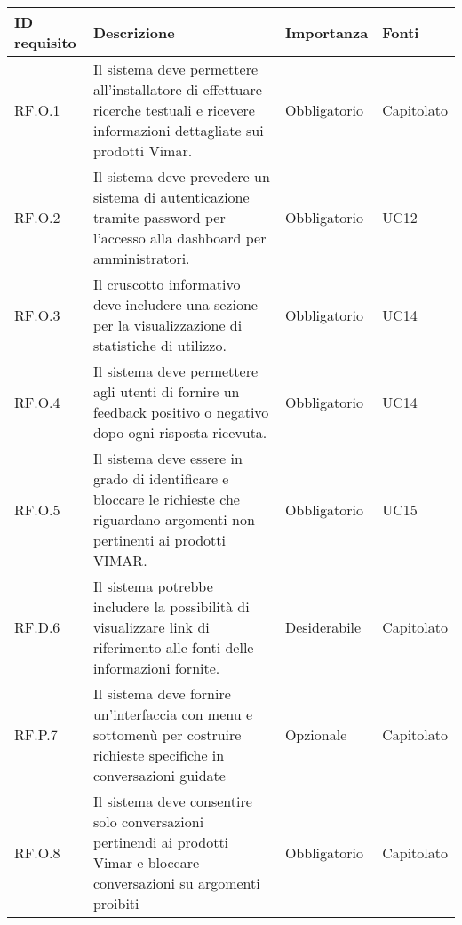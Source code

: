 \begin{table}[H]
    \begin{tabular}{|C{2.7cm}|L{7.2cm}|C{2.7cm}|C{2cm}|}
        \hline
        \textbf{ID requisito} & \textbf{Descrizione} & \textbf{Importanza} & \textbf{Fonti}  \\
        \hline
        RF.O.1 & Il sistema deve permettere all'installatore di effettuare ricerche testuali e ricevere informazioni dettagliate sui prodotti Vimar. & Obbligatorio & Capitolato \\
        \hline
        RF.O.2 & Il sistema deve prevedere un sistema di autenticazione tramite password per l'accesso alla dashboard per amministratori. & Obbligatorio & UC12 \\
        \hline
        RF.O.3 & Il cruscotto informativo deve includere una sezione per la visualizzazione di statistiche di utilizzo. & Obbligatorio & UC14 \\
        \hline
        RF.O.4 & Il sistema deve permettere agli utenti di fornire un feedback positivo o negativo dopo ogni risposta ricevuta. & Obbligatorio & UC14 \\
        \hline
        RF.O.5 & Il sistema deve essere in grado di identificare e bloccare le richieste che riguardano argomenti non pertinenti ai prodotti VIMAR. & Obbligatorio & UC15 \\
        \hline
        RF.D.6 & Il sistema potrebbe includere la possibilità di visualizzare link di riferimento alle fonti delle informazioni fornite. & Desiderabile & Capitolato \\
        \hline
        RF.P.7 & Il sistema deve fornire un'interfaccia con menu e sottomenù per costruire richieste specifiche in conversazioni guidate & Opzionale & Capitolato\\
        \hline
        RF.O.8 & Il sistema deve consentire solo conversazioni pertinendi ai prodotti Vimar e bloccare conversazioni su argomenti proibiti & Obbligatorio & Capitolato \\
        \hline
        \end{tabular}

\end{table}